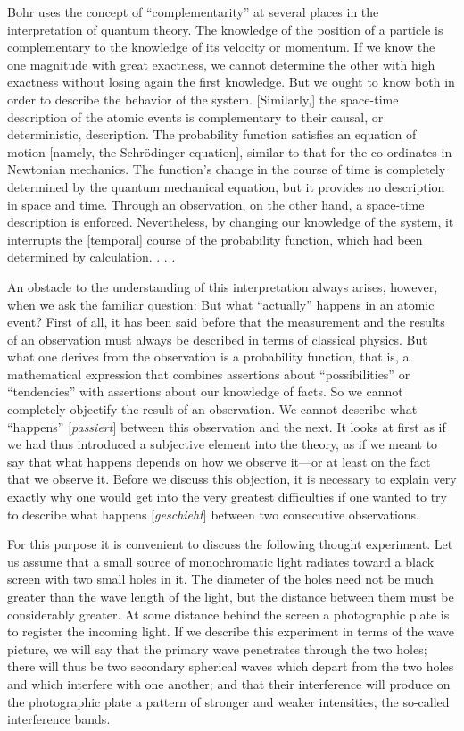 Bohr uses the concept of ``complementarity'' at several places in the
interpretation of quantum theory. The knowledge of the position of a
particle is complementary to the knowledge of its velocity or momentum.
If we know the one magnitude with great exactness, we cannot determine
the other with high exactness without losing again the first knowledge.
But we ought to know both in order to describe the behavior of the
system. {[}Similarly,{]} the space-time description of the atomic events
is complementary to their causal, or deterministic, description. The
probability function satisfies an equation of motion {[}namely, the
Schrödinger equation{]}, similar to that for the co-ordinates in
Newtonian mechanics. The function's change in the course of time is
completely determined by the quantum mechanical equation, but it
provides no description in space and time. Through an observation, on
the other hand, a space-time description is enforced. Nevertheless, by
changing our knowledge of the system, it interrupts the {[}temporal{]}
course of the probability function, which had been determined by
calculation. . . .

An obstacle to the understanding of this interpretation always arises,
however, when we ask the familiar question: But what ``actually''
happens in an atomic event? First of all, it has been said before that
the measurement and the results of an observation must always be
described in terms of classical physics. But what one derives from the
observation is a probability function, that is, a mathematical
expression that combines assertions about ``possibilities'' or
``tendencies'' with assertions about our knowledge of facts. So we
cannot completely objectify the result of an observation. We cannot
describe what ``happens'' {[}\emph{passiert}{]} between this observation
and the next. It looks at first as if we had thus introduced a
subjective element into the theory, as if we meant to say that what
happens depends on how we observe it---or at least on the fact that we
observe it. Before we discuss this objection, it is necessary to explain
very exactly why one would get into the very greatest difficulties if
one wanted to try to describe what happens {[}\emph{geschieht}{]}
between two consecutive observations.

For this purpose it is convenient to discuss the following thought
experiment. Let us assume that a small source of monochromatic light
radiates toward a black screen with two small holes in it. The diameter
of the holes need not be much greater than the wave length of the light,
but the distance between them must be considerably greater. At some
distance behind the screen a photographic plate is to register the
incoming light. If we describe this experiment in terms of the wave
picture, we will say that the primary wave penetrates through the two
holes; there will thus be two secondary spherical waves which depart
from the two holes and which interfere with one another; and that their
interference will produce on the photographic plate a pattern of
stronger and weaker intensities, the so-called interference bands.

